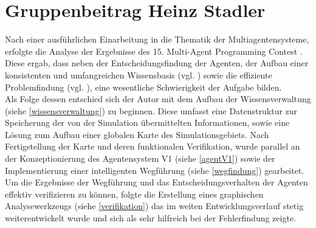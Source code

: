 \documentclass[runningheads]{llncs}
\begin{document}
\section{Gruppenbeitrag Heinz Stadler}
Nach einer ausführlichen Einarbeitung in die Thematik der Multiagentensysteme, erfolgte die Analyse der Ergebnisse des 15. Multi-Agent Programming Contest \cite{Ahlbrecht2021}. Diese ergab, dass neben der Entscheidungsfindung der Agenten, der Aufbau einer konsistenten und umfangreichen Wissensbasis (vgl. \cite[S. 29]{Ahlbrecht2021}) sowie die effiziente Problemfindung (vgl. \cite[S. 17]{Ahlbrecht2021}), eine wesentliche Schwierigkeit der Aufgabe bilden. \\
Als Folge dessen entschied sich der Autor mit dem Aufbau der Wissensverwaltung (siehe \ref{wissensverwaltung}) zu beginnen. Diese umfasst eine Datenstruktur zur Speicherung der von der Simulation übermittelten Informationen, sowie eine Lösung zum Aufbau einer globalen Karte des Simulationsgebiets. Nach Fertigstellung der Karte und deren funktionalen Verifikation, wurde parallel an der Konzeptionierung des Agentensystem V1 (siehe \ref{agentV1}) sowie der Implementierung einer intelligenten Wegführung (siehe \ref{wegfindung}) gearbeitet. Um die Ergebnisse der Wegführung und das Entscheidungsverhalten der Agenten effektiv verifizieren zu können, folgte die Erstellung eines graphischen Analysewerkzeugs (siehe \ref{verifikation}) das im weiten Entwicklungsverlauf stetig weiterentwickelt wurde und sich als sehr hilfreich bei der Fehlerfindung zeigte.
 
\end{document}
